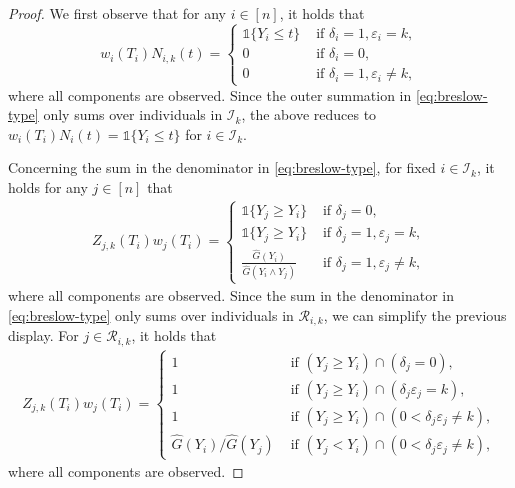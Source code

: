 \documentclass[11pt]{article}
\newcommand{\indic}{\mathds{1}}
\begin{document}
\begin{proof}
We first observe that for any $i \in [n]$, it holds that
	\[
		w_i(T_i) N_{i,k}(t)
		=
		\begin{cases}
		\indic \{ Y_i \leq t \} &\text{ if } \delta_i = 1, \varepsilon_i = k,
		\\
		0 &\text{ if } \delta_i = 0,
		\\
		 0 &\text{ if } \delta_i = 1, \varepsilon_i \neq k,
		\end{cases}
	\]
where all components are observed. Since the outer summation in \eqref{eq:breslow-type} only sums over individuals in $\mathcal{I}_k$, the above reduces to $w_i(T_i)N_i(t) = \indic \{ Y_i \leq t \}$ for $i \in \mathcal{I}_k$.	

Concerning the sum in the denominator in \eqref{eq:breslow-type}, for fixed $i\in\mathcal{I}_k$, it holds for any $j\in[n]$ that
\begin{align*}
	Z_{j,k}(T_i) w_j(T_i)
	=
	\begin{cases}
		\indic \{ Y_j \geq Y_i \}  &\text{ if } \delta_j = 0,
		\\
		\indic \{ Y_j \geq Y_i \}  &\text{ if } \delta_j = 1, \varepsilon_j = k,
		\\
		\frac{\widehat{G}(Y_i)}{\widehat{G}(Y_i \wedge Y_j)}  &\text{ if } \delta_j = 1, \varepsilon_j \neq k,	
		\end{cases}
\end{align*}
where all components are observed. Since the sum in the denominator in \eqref{eq:breslow-type} only sums over individuals in $\mathcal{R}_{i,k}$, we can simplify the previous display. For $j\in\mathcal{R}_{i,k}$, it holds that 
\begin{align*}
	Z_{j,k}(T_i) w_j(T_i)
	=
	\begin{cases}
		1  &\text{ if } (Y_j \geq Y_i) \cap (\delta_j = 0),
		\\
		1 &\text{ if } (Y_j \geq Y_i) \cap (\delta_j\varepsilon_j = k),
		\\
		1 &\text{ if } (Y_j \geq Y_i) \cap (0 < \delta_j \varepsilon_j \neq k),
		\\
		\widehat{G}(Y_i) / \widehat{G}(Y_j) &\text{ if } (Y_j < Y_i) \cap (0 < \delta_j \varepsilon_j \neq k),
		\end{cases}
\end{align*}	
where all components are observed.
\end{proof}
\end{document}
